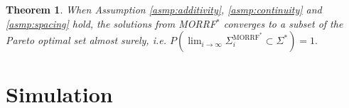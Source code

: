 \documentclass{article}
\newtheorem{thm}{Theorem}
\begin{document}
\begin{thm}
\label{thm:morrt:conv}
When Assumption \ref{asmp:additivity}, \ref{asmp:continuity} and \ref{asmp:spacing} hold,
the solutions from MORRF$^{*} $ converges to a subset of the Pareto optimal set almost surely, i.e.
$
P( \lim_{ i \to \infty }  \Sigma^{\mbox{MORRF}^{*}}_{i}  \subset \Sigma^{*} ) = 1.
$
%
\end{thm}

\section{Simulation}
\label{sec:simulation}

\end{document}

